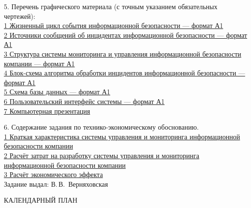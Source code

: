 {  \clearpage
  \thispagestyle{empty}

  5. Перечень графического материала (с точным указанием обязательных чертежей):
  \lineunderscore\\
  \uline{\hspace*{2ex}1 Жизненный цикл события информационной безопасности --- формат А1}\lineunderscore\\
  \uline{\hspace*{2ex}2 Источники сообщений об инцидентах информационной безопасности --- формат А1}\lineunderscore\\
  \uline{\hspace*{2ex}3 Структура системы мониторинга и управления информационной безопасности компании --- формат А1}\lineunderscore\\
  \uline{\hspace*{2ex}4 Блок-схема алгоритма обработки инцидентов информационной безопасности  --- формат А1}\lineunderscore\\
  \uline{\hspace*{2ex}5 Схема базы данных --- формат А1}\lineunderscore\\
  \uline{\hspace*{2ex}6 Пользовательский интерфейс системы --- формат А1}\lineunderscore\\
  \uline{\hspace*{2ex}7 Компьютерная презентация}\lineunderscore

  \vspace{1em} 

  6. Содержание задания по технико-экономическому обоснованию.\\
    \uline{\hspace*{2ex}1 Краткая характеристика системы управления и мониторинга информационной безопасности компании}\lineunderscore\\
    \uline{\hspace*{2ex}2 Расчёт затрат на разработку системы управления и мониторинга информационной безопасности компании}\lineunderscore\\
    \uline{\hspace*{2ex}3 Расчёт экономического эффекта}\lineunderscore\\

  Задание выдал: \hfill{} \uline{\hspace*{6em}}  В.\,В.~Верняховская 

  \vspace{1em}


  \begin{center}
    КАЛЕНДАРНЫЙ ПЛАН
  \end{center}

}

